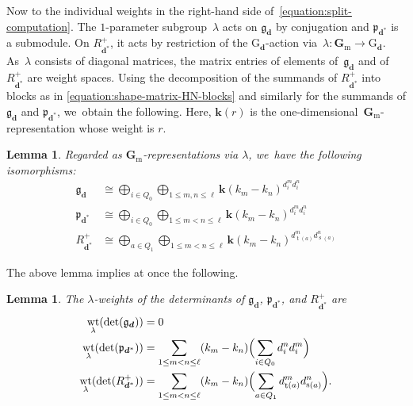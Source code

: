 \documentclass[11pt]{article}
\theoremstyle{plain}
\newtheorem{lemma}[theorem]{Lemma}
\theoremstyle{definition}
\DeclareMathOperator\source{s}
\DeclareMathOperator\target{t}
\DeclareMathOperator\weight{wt}
\newcommand\dash{\nobreakdash-\hspace{0pt}}
\newcommand\field{\mathbf{k}}
\newcommand\Gm{\ensuremath{\mathbf{G}_{\mathrm{m}}}}
\newcommand\group[1][\tuple{d}]{\mathrm{G}_{#1}}
\newcommand\tuple[1]{\ensuremath{{\boldsymbol{#1}}}}
\begin{document}
Now to the individual weights in the right-hand side of~\eqref{equation:split-computation}.
The $1$-parameter subgroup~$\lambda$ acts on $\mathfrak{g}_{\tuple{d}}$ by conjugation
and $\mathfrak{p}_{\tuple{d}^*}$ is a submodule.
On $R_{\tuple{d}^*}^+$,
it acts by restriction of the $\group$-action via~$\lambda\colon \Gm \to \group$.
As~$\lambda$ consists of diagonal matrices,
the matrix entries of elements of~$\mathfrak{g}_{\tuple{d}}$
and of~$R_{\tuple{d}^*}^+$ are weight spaces.
Using the decomposition of the summands of $R_{\tuple{d}^*}^+$
into blocks as in \eqref{equation:shape-matrix-HN-blocks}
and similarly for the summands of $\mathfrak{g}_{\tuple{d}}$ and $\mathfrak{p}_{\tuple{d}^*}$, we~obtain the following.
Here, $\field(r)$ is the one-dimensional~$\Gm$\dash representation
whose weight is $r$.
\begin{lemma}
\label{lemma:weights-fibers}
Regarded as $\Gm$-representations via $\lambda$, we~have the following isomorphisms:
\begin{align*}
\mathfrak{g}_{\tuple{d}} &\cong \bigoplus_{i \in Q_0} \bigoplus_{1 \leq m,n \leq \ell} \field(k_m-k_n)^{d_i^md_i^n} \\
\mathfrak{p}_{\tuple{d}^*} &\cong \bigoplus_{i \in Q_0} \bigoplus_{1 \leq m<n \leq \ell} \field(k_m-k_n)^{d_i^md_i^n} \\
R_{\tuple{d}^*}^+ &\cong \bigoplus_{a \in Q_1} \bigoplus_{1 \leq m < n \leq \ell} \field(k_m-k_n)^{d_{\target(a)}^md_{\source(a)}^n}
\end{align*}
\end{lemma}
The above lemma implies at once the following.
\begin{lemma}
\label{lemma:weights-determinants}
The $\lambda$-weights of the determinants of $\mathfrak{g}_{\tuple{d}}$, $\mathfrak{p}_{\tuple{d}^*}$, and $R_{\tuple{d}^*}^+$ are
\begin{align*}
\weight_\lambda(\det(\mathfrak{g}_{\tuple{d}})) &= 0 \\
\weight_\lambda(\det(\mathfrak{p}_{\tuple{d}^*})) &= \sum_{1 \leq m < n \leq \ell} (k_m - k_n) \Bigl(\sum_{i \in Q_0} d_i^n d_i^m\Bigr) \\
\weight_\lambda(\det(R_{\tuple{d}^*}^+)) &= \sum_{1 \leq m < n \leq \ell} (k_m - k_n) \Bigl(\sum_{a\in Q_1} d_{\target(a)}^m d_{\source(a)}^n\Bigr).
\end{align*}
\end{lemma}
\end{document}
